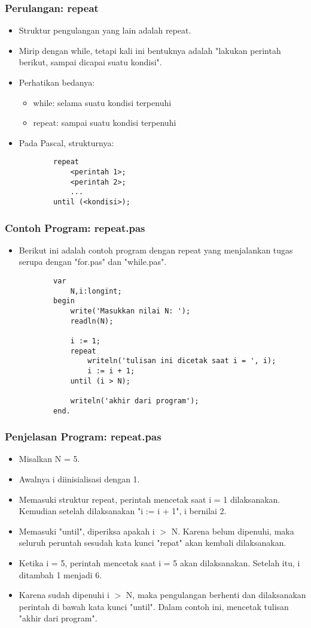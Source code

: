 \documentclass{beamer}
\begin{document}
\begin{frame}[fragile]
\frametitle{Perulangan: repeat}
\begin{itemize}
	\item Struktur pengulangan yang lain adalah repeat.
	\item Mirip dengan while, tetapi kali ini bentuknya adalah "lakukan perintah berikut, sampai dicapai suatu kondisi".
	\item Perhatikan bedanya:
	\begin{itemize}
		\item while: selama suatu kondisi terpenuhi
		\item repeat: sampai suatu kondisi terpenuhi
	\end{itemize}
	\item Pada Pascal, strukturnya:
	\begin{lstlisting}
		repeat
		    <perintah 1>;
		    <perintah 2>;
		    ...
		until (<kondisi>);
	\end{lstlisting}
\end{itemize}
\end{frame}

\begin{frame}[fragile]
\frametitle{Contoh Program: repeat.pas}
\begin{itemize}
	\item Berikut ini adalah contoh program dengan repeat yang menjalankan tugas serupa dengan "for.pas" dan "while.pas".
	\begin{lstlisting}
		var
		    N,i:longint;
		begin
		    write('Masukkan nilai N: ');
		    readln(N);
		
		    i := 1;
		    repeat
		        writeln('tulisan ini dicetak saat i = ', i);
		        i := i + 1;
		    until (i > N);
		
		    writeln('akhir dari program');
		end.
	\end{lstlisting}
\end{itemize}
\end{frame}

\begin{frame}
\frametitle{Penjelasan Program: repeat.pas}
\begin{itemize}
	\item Misalkan N = 5.
	\item Awalnya i diinisialisasi dengan 1.
	\item Memasuki struktur repeat, perintah mencetak saat i = 1 dilaksanakan. Kemudian setelah dilaksanakan "i := i + 1", i bernilai 2.
	\item Memasuki "until", diperiksa apakah i $>$ N. Karena belum dipenuhi, maka seluruh peruntah sesudah kata kunci "repat" akan kembali dilaksanakan.
	\item Ketika i = 5, perintah mencetak saat i = 5 akan dilaksanakan. Setelah itu, i ditambah 1 menjadi 6.
	\item Karena sudah dipenuhi i $>$ N, maka pengulangan berhenti dan dilaksanakan perintah di bawah kata kunci "until". Dalam contoh ini, mencetak tulisan "akhir dari program".
\end{itemize}
\end{frame}
\end{document}
